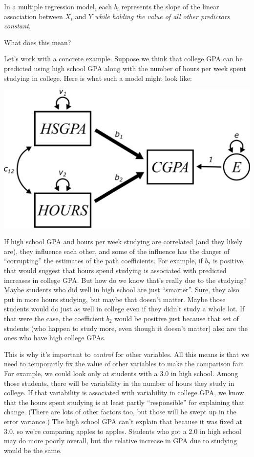 \documentclass[
]{book}
\begin{document}
In a multiple regression model, each \(b_{i}\) represents the slope of the linear association between \(X_{i}\) and \(Y\) \emph{while holding the value of all other predictors constant}.

What does this mean?

Let's work with a concrete example. Suppose we think that college GPA can be predicted using high school GPA along with the number of hours per week spent studying in college. Here is what such a model might look like:

\begin{center}\includegraphics{graphics/multiple_regression_example} \end{center}

If high school GPA and hours per week studying are correlated (and they likely are), they influence each other, and some of the influence has the danger of ``corrupting'' the estimates of the path coefficients. For example, if \(b_{2}\) is positive, that would suggest that hours spend studying is associated with predicted increases in college GPA. But how do we know that's really due to the studying? Maybe students who did well in high school are just ``smarter''. Sure, they also put in more hours studying, but maybe that doesn't matter. Maybe those students would do just as well in college even if they didn't study a whole lot. If that were the case, the coefficient \(b_{2}\) would be positive just because that set of students (who happen to study more, even though it doesn't matter) also are the ones who have high college GPAs.

This is why it's important to \emph{control} for other variables. All this means is that we need to temporarily fix the value of other variables to make the comparison fair. For example, we could look only at students with a 3.0 in high school. Among those students, there will be variability in the number of hours they study in college. If that variability is associated with variability in college GPA, we know that the hours spent studying is at least partly ``responsible'' for explaining that change. (There are lots of other factors too, but those will be swept up in the error variance.) The high school GPA can't explain that because it was fixed at 3.0, so we're comparing apples to apples. Students who got a 2.0 in high school may do more poorly overall, but the relative increase in GPA due to studying would be the same.
\end{document}
